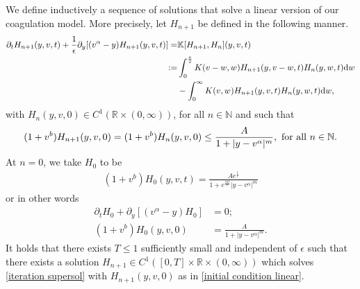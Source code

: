 \documentclass[11pt]{article}
\numberwithin{equation}{section}
\newcommand{\der}{\textup{d}}
\begin{document}
We define inductively a sequence of solutions that solve a linear version of our coagulation model. More precisely, let $H_{n+1}$ be defined in the following manner.
\begin{align}
    \partial_{t}H_{n+1}(y,v,t)+\frac{1}{\epsilon}\partial_{y}[(v^{\alpha}-y)H_{n+1}(y,v,t)]=&\mathbb{K}[H_{n+1},H_{n}](y,v,t)\nonumber\\
    :=&\int_{0}^{\frac{v}{2}}K(v-w,w)H_{n+1}(y,v-w,t)H_{n}(y,w,t)\der w\nonumber \\
   &-\int_{0}^{\infty}K(v,w)H_{n+1}(y,v,t)H_{n}(y,w,t)\der w ,\label{iteration supersol}
\end{align}
with $H_{n}(y,v,0)\in  C^{1}(\mathbb{R}\times (0,\infty))$, for all $n\in\mathbb{N}$ and such that
\begin{align}\label{initial condition linear}
(1+v^{b})H_{n+1}(y,v,0)=(1+v^{b})H_{n}(y,v,0)\leq \frac{A}{1+|y-v^{\alpha}|^{m}}, \textup{ for all } n\in \mathbb{N}.
\end{align}
At $n=0$, we take $H_{0}$ to be
\begin{align}\label{h0 form}
(1+v^{b})H_{0}(y,v,t)=\frac{A e^{\frac{t}{\epsilon}}}{1+e^{\frac{mt}{\epsilon}}|y-v^{\alpha}|^{m}}
\end{align}
or in other words 
\begin{align}
\partial_{t}H_{0}+\partial_{y}[(v^{\alpha}-y)H_{0}]&=0;\label{h0 pde}\\
(1+v^{b})H_{0}(y,v,0)&=\frac{A}{1+|y-v^{\alpha}|^{m}}.\nonumber
\end{align}
It holds that there exists $T\leq 1$ sufficiently small and independent of $\epsilon$ such that there exists a solution $H_{n+1}\in C^{1}([0,T]\times \mathbb{R}\times (0,\infty))$ which solves \eqref{iteration supersol} with $H_{n+1}(y,v,0)$ as in \eqref{initial condition linear}.
\end{document}

